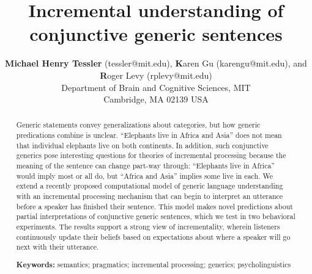 \documentclass[10pt,letterpaper]{article}
\title{Incremental understanding of conjunctive generic sentences}
\author{{\large \textbf{Michael Henry Tessler} (tessler@mit.edu)}, {\large {\textbf Karen Gu} (karengu@mit.edu)}, and {\large {\textbf Roger Levy} (rplevy@mit.edu)} \\
  Department of Brain and Cognitive Sciences, MIT \\
  Cambridge, MA 02139 USA}
\begin{document}
\maketitle


\begin{abstract}
\vspace{-0.1cm}

Generic statements convey generalizations about categories, but how generic predications combine is unclear.
``Elephants live in Africa and Asia'' does not mean that individual elephants live on both continents.
In addition, such conjunctive generics pose interesting questions for theories of incremental processing because the meaning of the sentence can change part-way through: ``Elephants live in Africa'' would imply most or all do, but ``Africa and Asia'' implies some live in each. 
We extend a recently proposed computational model of generic language understanding with an incremental processing mechanism that can begin to interpret an utterance before a speaker has finished their sentence.
This model makes novel predictions about partial interpretations of conjunctive generic sentences, which we test in two behavioral experiments. 
The results support a strong view of incrementality, wherein listeners continuously update their beliefs based on expectations about where a speaker will go next with their utterance.



\textbf{Keywords:} 
semantics; pragmatics; incremental processing; generics; psycholinguistics
\end{abstract}
\end{document}
